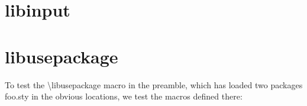 \documentclass[minimal]{omdoc}
\begin{document}
\section{libinput}


\section{libusepackage}
To test the \textsf{\textbackslash libusepackage} macro in the preamble, which has loaded
two packages \textsf{foo.sty} in the obvious locations, we test the macros defined there:  
\end{document}
